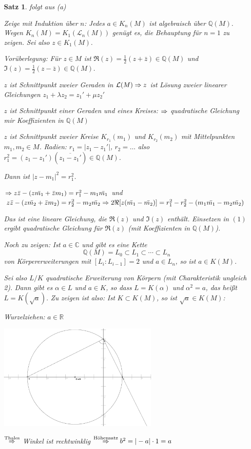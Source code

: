 \documentclass[a4paper,10pt,german]{scrbook}
\theoremstyle{saetze}
\newtheorem{Satz}{Satz}
\theoremstyle{definitionen}
\begin{document}
\begin{Satz}
{\item folgt aus (a)

\item Zeige mit Induktion über $n$: Jedes $a\in K_n(M)$ ist algebraisch über $\mathbb Q(M)$. Wegen $K_n(M)=K_1(\mathcal L_n(M))$ genügt es, die Behauptung für $n=1$ zu zeigen. Sei also $z\in K_1(M)$.

Vorüberlegung: Für $z \in M$ ist $\Re(z) =
\frac{1}{2}(z+\bar z) \in \mathbb{Q}(M)$ und $\Im(z) = \frac{1}{2}(z
-\bar z) \in \mathbb{Q}(M).$
\begin{enum}
\item $z$ ist Schnittpunkt zweier Geraden in $\mathcal{L}(M) \Rightarrow
z$ ist Lösung zweier linearer Gleichungen $z_1 + \lambda z_2 = z_1'
+ \mu z_2'$
\item $z$ ist Schnittpunkt einer Geraden und eines Kreises: $\Rightarrow$
quadratische Gleichung mir Koeffizienten in $\mathbb{Q}(M)$
\item $z$ ist Schnittpunkt zweier Kreise $K_{r_1}(m_1)$ und
$K_{r_2}(m_2)$ mit Mittelpunkten $m_1,m_2 \in M$. Radien: $r_1 =
|z_1 - z_1'|$, $r_2 = \dots$ also $r_1^2 = (z_1 - z_1') (\overline{z_1 -
z_1'}) \in \mathbb{Q}(M)$.

Dann ist $|z-m_1|^2 = r_1^2$.

$\Rightarrow z\bar z - (z\bar{m_1} + \bar z m_1) = r_1^2 - m_1 \bar{m_1}$
und $z \bar z - (z \bar{m_2} + \bar z m_2) = r_2^2 - m_2 \bar{m_2}
\Rightarrow 2 \Re[z(\bar{m_1} - \bar{m_2})] = r_1^2 - r_2^2 - (m_1 \bar{m_1}
- m_2 \bar{m_2})$

Das ist eine lineare Gleichung, die $\Re(z)$ und $\Im(z)$ enthält.
Einsetzen in $(1)$ ergibt quadratische Gleichung für $\Re(z)$ (mit
Koeffizienten in $\mathbb{Q}(M)$).
\end{enum}

Noch zu zeigen: Ist $a\in \mathbb C$ und gibt es eine Kette 
\[
\mathbb Q(M) = L_0\subset L_1\subset \cdots \subset L_n
\]
von Körpererweiterungen mit $[L_i:L_{i-1}]=2$ und $a\in L_n$, so ist $a\in K(M)$.

Sei also $L/K$ quadratische Erweiterung von Körpern (mit Charakteristik ungleich 2). Dann gibt es $\alpha\in L$ und $a \in K$, so dass $L=K(\alpha)$ und $\alpha^2=a$, das heißt $L=K(\sqrt{a})$. Zu zeigen ist also: Ist $K\subset K(M)$, so ist $\sqrt a\in K(M)$:

Wurzelziehen: $a \in \mathbb{R}$
\begin{center}
\includegraphics[width=0.6\textwidth]{alg16b.png}
\end{center}
$\overset{\scriptsize\mbox{Thales}}{\Rightarrow}$ Winkel ist rechtwinklig
$\overset{\scriptsize\mbox{Höhensatz}}{\Rightarrow} b^2=|-a| \cdot 1 = a$
}
\end{Satz}
\end{document}
